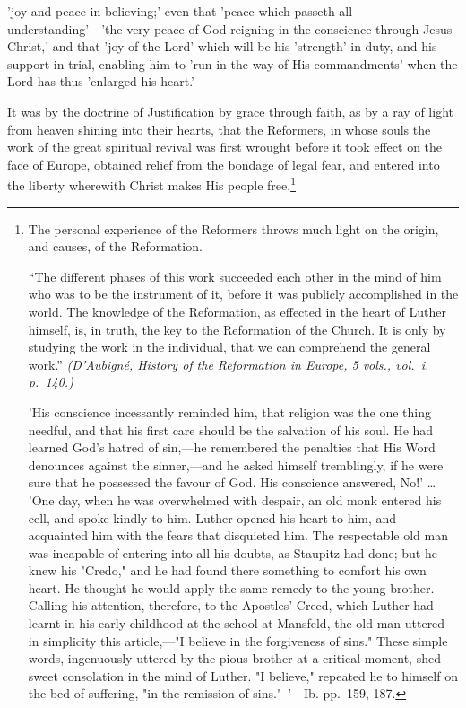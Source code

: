 \documentclass[
]{book}
\begin{document}
'joy and peace in believing;' even that 'peace which passeth all understanding'---'the very peace of God reigning in the conscience through Jesus Christ,' and that 'joy of the Lord' which will be his 'strength' in duty, and his support in trial, enabling him to 'run in the way of His commandments' when the Lord has thus 'enlarged his heart.'

It was by the doctrine of Justification by grace through faith, as by a ray of light from heaven shining into their hearts, that the Reformers, in whose souls the work of the great spiritual revival was first wrought before it took effect on the face of Europe, obtained relief from the bondage of legal fear, and entered into the liberty wherewith Christ makes His people free.\footnote{The personal experience of the Reformers throws much light on the origin, and causes, of the Reformation.

  ``The different phases of this work succeeded each other in the mind of him who was to be the instrument of it, before it was publicly accomplished in the world. The knowledge of the Reformation, as effected in the heart of Luther himself, is, in truth, the key to the Reformation of the Church. It is only by studying the work in the individual, that we can comprehend the general work.'' \emph{(D'Aubigné, History of the Reformation in Europe, 5 vols., vol.~i. p.~140.)}

  'His conscience incessantly reminded him, that religion was the one thing needful, and that his first care should be the salvation of his soul. He had learned God's hatred of sin,---he remembered the penalties that His Word denounces against the sinner,---and he asked himself tremblingly, if he were sure that he possessed the favour of God. His conscience answered, No!' \ldots{} 'One day, when he was overwhelmed with despair, an old monk entered his cell, and spoke kindly to him. Luther opened his heart to him, and acquainted him with the fears that disquieted him. The respectable old man was incapable of entering into all his doubts, as Staupitz had done; but he knew his "Credo," and he had found there something to comfort his own heart. He thought he would apply the same remedy to the young brother. Calling his attention, therefore, to the Apostles' Creed, which Luther had learnt in his early childhood at the school at Mansfeld, the old man uttered in simplicity this article,---"I believe in the forgiveness of sins." These simple words, ingenuously uttered by the pious brother at a critical moment, shed sweet consolation in the mind of Luther. "I believe," repeated he to himself on the bed of suffering, "in the remission of sins."~'---Ib. pp.~159, 187.

}
\end{document}
